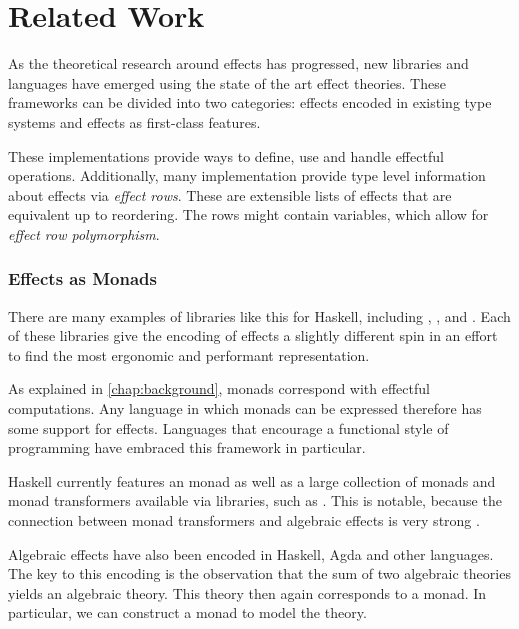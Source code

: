 \chapter{Related Work}\label{chap:related_work}

As the theoretical research around effects has progressed, new libraries and languages have emerged using the state of the art effect theories. These frameworks can be divided into two categories: effects encoded in existing type systems and effects as first-class features.

These implementations provide ways to define, use and handle effectful operations. Additionally, many implementation provide type level information about effects via \emph{effect rows}. These are extensible lists of effects that are equivalent up to reordering. The rows might contain variables, which allow for \emph{effect row polymorphism}.

\subsection{Effects as Monads}

There are many examples of libraries like this for Haskell, including , ,  and . Each of these libraries give the encoding of effects a slightly different spin in an effort to find the most ergonomic and performant representation.

As explained in \cref{chap:background}, monads correspond with effectful computations. Any language in which monads can be expressed therefore has some support for effects. Languages that encourage a functional style of programming have embraced this framework in particular.

Haskell currently features an  monad \autocite{peyton_jones_imperative_1993} as well as a large collection of monads and monad transformers available via libraries, such as . This is notable, because the connection between monad transformers and algebraic effects is very strong \autocite{schrijvers_monad_2019}.

Algebraic effects have also been encoded in Haskell, Agda and other languages. The key to this encoding is the observation that the sum of two algebraic theories yields an algebraic theory. This theory then again corresponds to a monad. In particular, we can construct a  monad to model the theory.

